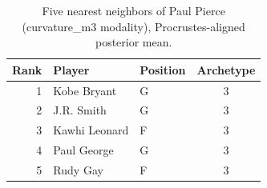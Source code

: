 \begin{table}[htbp]
  \centering\small
  \begin{tabular}{rllc}
    \toprule
    Rank & Player & Position & Archetype \\
    \midrule
    1 & Kobe Bryant & G & 3 \\
    2 & J.R. Smith & G & 3 \\
    3 & Kawhi Leonard & F & 3 \\
    4 & Paul George & G & 3 \\
    5 & Rudy Gay & F & 3 \\
    \bottomrule
  \end{tabular}
  \caption{Five nearest neighbors of Paul Pierce (curvature_m3 modality), Procrustes-aligned posterior mean.}
  \label{tab:Paul_Pierce_neighbors_curvature_m3}
\end{table}

